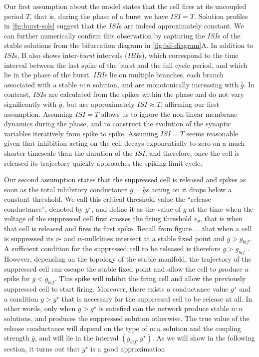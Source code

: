Our first assumption about the model states that the \free{} cell fires at its uncoupled period $T$, that is, during the \free{} phase of a burst we have $ISI=T$.
Solution profiles in \cref{fig:burst-sols} suggest that the $ISI$s are indeed approximately constant.
We can further numerically confirm this observation by capturing the $ISI$s of the stable solutions from the bifurcation diagram in \cref{fig:bif-diagram}A.
In addition to $ISI$s, B also shows inter-\textit{burst} intervals ($IBI$s), which correspond to the time interval between the last spike of the burst and the full cycle period, and which lie in the \suppressed{} phase of the burst.
$IBI$s lie on multiple branches, each branch associated with a stable $n:n$ solution, and are monotonically increasing with $\bar g$.
In contrast, $ISI$s are calculated from the spikes within the \free{} phase and do not vary significantly with $\bar g$, but are approximately $ISI\approx T$, affirming our first assumption.
Assuming $ISI=T$ allows us to ignore the non-linear membrane dynamics during the \free{} phase, and to construct the evolution of the synaptic variables iteratively from spike to spike.
Assuming $ISI=T$ seems reasonable given that inhibition acting on the \suppressed{} cell decays exponentially to zero on a much shorter timescale than the duration of the $ISI$, and therefore, once the \suppressed{} cell is released its trajectory quickly approaches the spiking limit cycle.

Our second assumption states that the suppressed cell is released and spikes as soon as the total inhibitory conductance $g = \bar g s$ acting on it drops below a constant threshold.
We call this critical threshold value the ``release conductance'', denoted by $g^\star$, and define it as the value of $g$ at the time when the voltage of the suppressed cell first crosses the firing threshold $v_{\theta}$, that is when that cell is released and fires its first spike.
Recall from figure ... that when a cell is suppressed its $v$- and $w$-nullclines intersect at a stable fixed point and $g > g_{bif}$.
A sufficient condition for the suppressed cell to be released is therefore $g > g_{bif}$ .
However, depending on the topology of the stable manifold, the trajectory of the suppressed cell can escape the stable fixed point and allow the cell to produce a spike for $g < g_{bif}$.
This spike will inhibit the firing cell and allow the previously suppressed cell to start firing.
Moreover, there exists a conductance value $g^{\star}$ and a condition $g > g^{\star}$ that is necessary for the suppressed cell to be release at all.
In other words, only when $g > g^{\star}$ is satisfied can the network produce stable $n:n$ solutions, and produces the suppressed solution otherwise.
The true value of the release conductance will depend on the type of $n:n$ solution and the coupling strength $\bar g$, and will lie in the interval $(g_{bif}, g^{\star})$.
As we will show in the following section, it turns out that $g^{\star}$ is a good approximation

